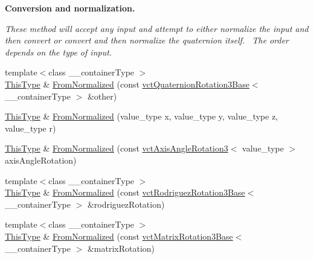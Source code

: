 \begin{Indent}{\bf Conversion and normalization.}\par
{\em These method will accept any input and attempt to either normalize the input and then convert or convert and then normalize the quaternion itself.~\newline
The order depends on the type of input. }\begin{DoxyCompactItemize}
\item 
{\footnotesize template$<$class \+\_\+\+\_\+container\+Type $>$ }\\\hyperlink{classvct_quaternion_base_af28efdc38acf89acb7a67afada11408c}{This\+Type} \& \hyperlink{classvct_quaternion_rotation3_base_afd47a2757a43293b69825cc1d5a1d47c}{From\+Normalized} (const \hyperlink{classvct_quaternion_rotation3_base}{vct\+Quaternion\+Rotation3\+Base}$<$ \+\_\+\+\_\+container\+Type $>$ \&other)
\item 
\hyperlink{classvct_quaternion_base_af28efdc38acf89acb7a67afada11408c}{This\+Type} \& \hyperlink{classvct_quaternion_rotation3_base_a45b5b924af0ce4cffde44a71eb907448}{From\+Normalized} (value\+\_\+type x, value\+\_\+type y, value\+\_\+type z, value\+\_\+type r)
\item 
\hyperlink{classvct_quaternion_base_af28efdc38acf89acb7a67afada11408c}{This\+Type} \& \hyperlink{classvct_quaternion_rotation3_base_a8da7956fa2689bc098cd54aa8d876c50}{From\+Normalized} (const \hyperlink{classvct_axis_angle_rotation3}{vct\+Axis\+Angle\+Rotation3}$<$ value\+\_\+type $>$ axis\+Angle\+Rotation)
\item 
{\footnotesize template$<$class \+\_\+\+\_\+container\+Type $>$ }\\\hyperlink{classvct_quaternion_base_af28efdc38acf89acb7a67afada11408c}{This\+Type} \& \hyperlink{classvct_quaternion_rotation3_base_a4f5a76c0336a1c208d537c3f0e4d10ff}{From\+Normalized} (const \hyperlink{classvct_rodriguez_rotation3_base}{vct\+Rodriguez\+Rotation3\+Base}$<$ \+\_\+\+\_\+container\+Type $>$ \&rodriguez\+Rotation)
\item 
{\footnotesize template$<$class \+\_\+\+\_\+container\+Type $>$ }\\\hyperlink{classvct_quaternion_base_af28efdc38acf89acb7a67afada11408c}{This\+Type} \& \hyperlink{classvct_quaternion_rotation3_base_aca57ab3ef2841ef2c07a93018909fbad}{From\+Normalized} (const \hyperlink{classvct_matrix_rotation3_base}{vct\+Matrix\+Rotation3\+Base}$<$ \+\_\+\+\_\+container\+Type $>$ \&matrix\+Rotation)
\end{DoxyCompactItemize}
\end{Indent}
